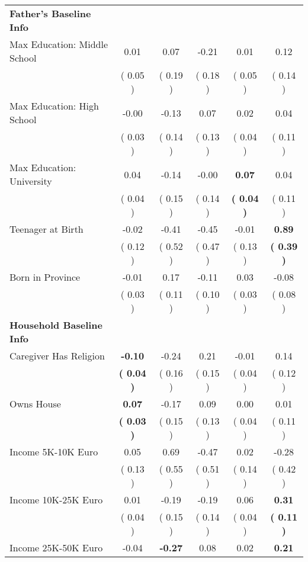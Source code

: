 \begin{table}[H]
{\begin{tabular}{lccccc}
\midrule
\textbf{Father's Baseline Info} \\
\quad Max Education: Middle School &      0.01 &      0.07 &     -0.21 &      0.01 &      0.12 \\
\quad  & (     0.05 ) & (     0.19 )  & (     0.18 )  & (     0.05 ) & (     0.14 ) \\
\quad Max Education: High School &     -0.00 &     -0.13 &      0.07 &      0.02 &      0.04 \\
\quad  & (     0.03 ) & (     0.14 )  & (     0.13 )  & (     0.04 ) & (     0.11 ) \\
\quad Max Education: University &      0.04 &     -0.14 &     -0.00 & \textbf{     0.07} &      0.04 \\
\quad  & (     0.04 ) & (     0.15 )  & (     0.14 )  & \textbf{(     0.04 )} & (     0.11 ) \\
\quad Teenager at Birth &     -0.02 &     -0.41 &     -0.45 &     -0.01 & \textbf{     0.89} \\
\quad  & (     0.12 ) & (     0.52 )  & (     0.47 )  & (     0.13 ) & \textbf{(     0.39 )} \\
\quad Born in Province &     -0.01 &      0.17 &     -0.11 &      0.03 &     -0.08 \\
\quad  & (     0.03 ) & (     0.11 )  & (     0.10 )  & (     0.03 ) & (     0.08 ) \\
\midrule
\textbf{Household Baseline Info} \\
\quad Caregiver Has Religion & \textbf{    -0.10} &     -0.24 &      0.21 &     -0.01 &      0.14 \\
\quad  & \textbf{(     0.04 )} & (     0.16 )  & (     0.15 )  & (     0.04 ) & (     0.12 ) \\
\quad Owns House & \textbf{     0.07} &     -0.17 &      0.09 &      0.00 &      0.01 \\
\quad  & \textbf{(     0.03 )} & (     0.15 )  & (     0.13 )  & (     0.04 ) & (     0.11 ) \\
\quad Income 5K-10K Euro &      0.05 &      0.69 &     -0.47 &      0.02 &     -0.28 \\
\quad  & (     0.13 ) & (     0.55 )  & (     0.51 )  & (     0.14 ) & (     0.42 ) \\
\quad Income 10K-25K Euro &      0.01 &     -0.19 &     -0.19 &      0.06 & \textbf{     0.31} \\
\quad  & (     0.04 ) & (     0.15 )  & (     0.14 )  & (     0.04 ) & \textbf{(     0.11 )} \\
\quad Income 25K-50K Euro &     -0.04 & \textbf{    -0.27} &      0.08 &      0.02 & \textbf{     0.21} \\

\end{tabular}}
\end{table}
